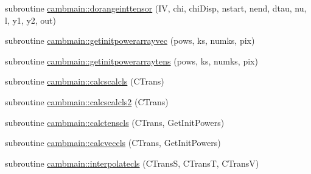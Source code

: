 \begin{DoxyCompactItemize}
subroutine \mbox{\hyperlink{namespacecambmain_af5113df414eaba3ff8913a737da72c34}{cambmain\+::dorangeinttensor}} (IV, chi, chi\+Disp, nstart, nend, dtau, nu, l, y1, y2, out)
\item 
subroutine \mbox{\hyperlink{namespacecambmain_a5fb4d38dca7390cd662572152b12f7d0}{cambmain\+::getinitpowerarrayvec}} (pows, ks, numks, pix)
\item 
subroutine \mbox{\hyperlink{namespacecambmain_af4005843871d59b0973861e895fdb0d3}{cambmain\+::getinitpowerarraytens}} (pows, ks, numks, pix)
\item 
subroutine \mbox{\hyperlink{namespacecambmain_a8b2cc98e7553a77d720caca21f5ae8e5}{cambmain\+::calcscalcls}} (C\+Trans)
\item 
subroutine \mbox{\hyperlink{namespacecambmain_a89e57ae788ae9b3065000febda0566a5}{cambmain\+::calcscalcls2}} (C\+Trans)
\item 
subroutine \mbox{\hyperlink{namespacecambmain_a412610e13dd6e264ce9d9ac33e0fbc1f}{cambmain\+::calctenscls}} (C\+Trans, Get\+Init\+Powers)
\item 
subroutine \mbox{\hyperlink{namespacecambmain_a709092859c794b6298b580be81ff9a90}{cambmain\+::calcveccls}} (C\+Trans, Get\+Init\+Powers)
\item 
subroutine \mbox{\hyperlink{namespacecambmain_a411e6e866cbb05f2ba3f7164f8e04a67}{cambmain\+::interpolatecls}} (C\+TransS, C\+TransT, C\+TransV)
\end{DoxyCompactItemize}
